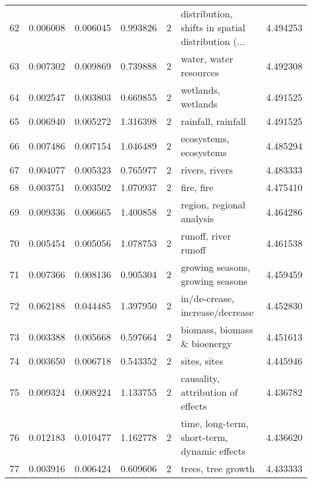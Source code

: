 \begin{tabular}{lrrrrlr}
62  &    0.006008 &  0.006045 &        0.993826 &           2 &  distribution, shifts in spatial distribution (... &  4.494253 \\
63  &    0.007302 &  0.009869 &        0.739888 &           2 &                             water, water resources &  4.492308 \\
64  &    0.002547 &  0.003803 &        0.669855 &           2 &                                 wetlands, wetlands &  4.491525 \\
65  &    0.006940 &  0.005272 &        1.316398 &           2 &                                 rainfall, rainfall &  4.491525 \\
66  &    0.007486 &  0.007154 &        1.046489 &           2 &                             ecosystems, ecosystems &  4.485294 \\
67  &    0.004077 &  0.005323 &        0.765977 &           2 &                                     rivers, rivers &  4.483333 \\
68  &    0.003751 &  0.003502 &        1.070937 &           2 &                                         fire, fire &  4.475410 \\
69  &    0.009336 &  0.006665 &        1.400858 &           2 &                          region, regional analysis &  4.464286 \\
70  &    0.005454 &  0.005056 &        1.078753 &           2 &                               runoff, river runoff &  4.461538 \\
71  &    0.007366 &  0.008136 &        0.905304 &           2 &                   growing seasons, growing seasons &  4.459459 \\
72  &    0.062188 &  0.044485 &        1.397950 &           2 &                    in/de-crease, increase/decrease &  4.452830 \\
73  &    0.003388 &  0.005668 &        0.597664 &           2 &                       biomass, biomass \& bioenergy &  4.451613 \\
74  &    0.003650 &  0.006718 &        0.543352 &           2 &                                       sites, sites &  4.445946 \\
75  &    0.009324 &  0.008224 &        1.133755 &           2 &                  causality, attribution of effects &  4.436782 \\
76  &    0.012183 &  0.010477 &        1.162778 &           2 &       time, long-term, short-term, dynamic effects &  4.436620 \\
77  &    0.003916 &  0.006424 &        0.609606 &           2 &                                 trees, tree growth &  4.433333 \\

\end{tabular}
